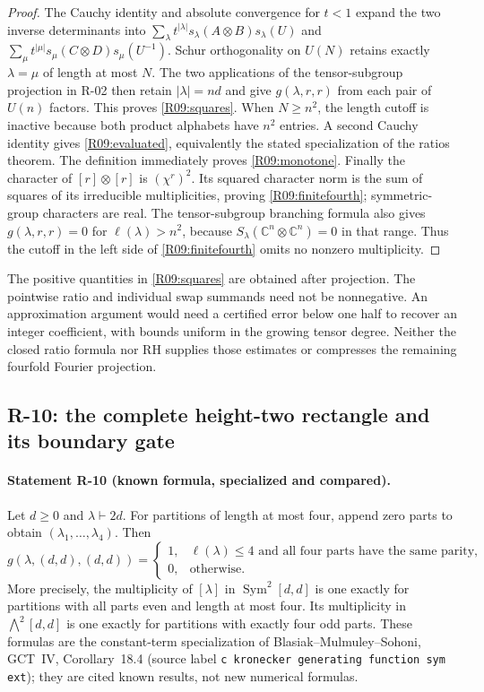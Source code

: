 \documentclass[11pt,a4paper]{article}
\theoremstyle{definition}\newtheorem{definition}{Definition}
\begin{document}
\begin{proof}
The Cauchy identity and absolute convergence for $t<1$ expand the two
inverse determinants into
$\sum_\lambda t^{|\lambda|}s_\lambda(A\otimes B)s_\lambda(U)$
and
$\sum_\mu t^{|\mu|}s_\mu(C\otimes D)s_\mu(U^{-1})$.
Schur orthogonality on $U(N)$ retains exactly $\lambda=\mu$ of
length at most $N$. The two applications of the tensor-subgroup
projection in R-02 then retain $|\lambda|=nd$ and give
$g(\lambda,r,r)$ from each pair of $U(n)$ factors. This proves
\eqref{R09:squares}. When $N\geq n^2$, the length cutoff is
inactive because both product alphabets have $n^2$ entries. A second
Cauchy identity gives \eqref{R09:evaluated}, equivalently the stated
specialization of the ratios theorem. The definition immediately
proves \eqref{R09:monotone}. Finally the character of
$[r]\otimes[r]$ is $(\chi^r)^2$. Its squared character norm is
the sum of squares of its irreducible multiplicities, proving
\eqref{R09:finitefourth}; symmetric-group characters are real.
The tensor-subgroup branching formula also gives
$g(\lambda,r,r)=0$ for $\ell(\lambda)>n^2$, because
$S_\lambda(\mathbb C^n\otimes\mathbb C^n)=0$ in that range.
Thus the cutoff in the left side of \eqref{R09:finitefourth}
omits no nonzero multiplicity.
\end{proof}

The positive quantities in \eqref{R09:squares} are obtained after
projection. The pointwise ratio and individual swap summands need
not be nonnegative. An approximation argument would need a
certified error below one half to recover an integer coefficient,
with bounds uniform in the growing tensor degree. Neither the
closed ratio formula nor RH supplies those estimates or compresses
the remaining fourfold Fourier projection.

\subsection{R-10: the complete height-two rectangle and its boundary gate}

\paragraph{Statement R-10 (known formula, specialized and compared).}
Let $d\geq0$ and $\lambda\vdash2d$. For partitions of length at
most four, append zero parts to obtain $(\lambda_1,\ldots,\lambda_4)$.
Then
\begin{equation}\label{R10:rectangle}
g(\lambda,(d,d),(d,d))=
\begin{cases}
1,&\ell(\lambda)\leq4\text{ and all four parts have the same parity},\\
0,&\text{otherwise}.
\end{cases}
\end{equation}
More precisely, the multiplicity of $[\lambda]$ in
$\operatorname{Sym}^2[d,d]$ is one exactly for partitions with all
parts even and length at most four. Its multiplicity in
$\bigwedge^2[d,d]$ is one exactly for partitions with exactly four
odd parts. These formulas are the constant-term specialization of
Blasiak--Mulmuley--Sohoni, GCT~IV, Corollary~18.4
(source label \texttt{c kronecker generating function sym ext});
they are cited known results, not new numerical formulas.
\end{document}
